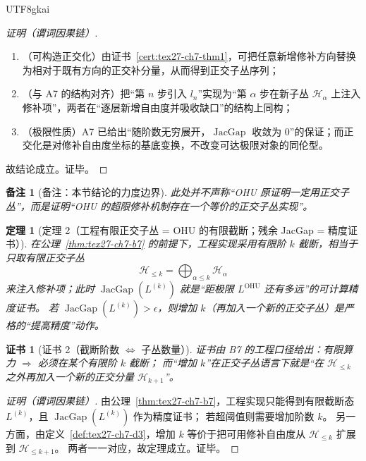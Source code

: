 \documentclass[12pt]{article}
\newtheorem{theorem}{定理}[section]
\newtheorem{remark}{备注}[section]
\newtheorem{Certificate}{证书}[section]
\newcommand{\JacGap}{\operatorname{JacGap}}
\begin{document}
\begin{CJK*}{UTF8}{gkai}
\begin{proof}[证明（谓词因果链）]
\begin{enumerate}
  \item（可构造正交化）由证书~\ref{cert:tex27-ch7-thm1}，可把任意新增修补方向替换为相对于既有方向的正交补分量，从而得到正交子丛序列；
  \item（与 A7 的结构对齐）把“第 $n$ 步引入 $l_n$”实现为“第 $\alpha$ 步在新子丛 $\mathcal{H}_\alpha$ 上注入修补项”，两者在“逐层新增自由度并吸收缺口”的结构上同构；
  \item（极限性质）A7 已给出“随阶数无穷展开，$\JacGap$ 收敛为 0”的保证；而正交化是对修补自由度坐标的基底变换，不改变可达极限对象的同伦型。
\end{enumerate}
故结论成立。证毕。
\end{proof}

\begin{remark}[备注：本节结论的力度边界]
此处并不声称“OHU 原证明一定用正交子丛”，而是证明“OHU 的超限修补机制\emph{存在一个等价的正交子丛实现}”。
\end{remark}

\begin{theorem}[定理 2（工程有限正交子丛 = OHU 的有限截断；残余 JacGap = 精度证书）]
\label{thm:tex27-ch7-thm2}
在公理~\ref{thm:tex27-ch7-b7} 的前提下，工程实现采用有限阶 $k$ 截断，相当于只取有限正交子丛
\[
  \mathcal{H}_{\le k}=\bigoplus_{\alpha\le k}\mathcal{H}_\alpha
\]
来注入修补项；此时 $\JacGap(L^{(k)})$ 就是“距极限 $L^{\mathrm{OHU}}$ 还有多远”的可计算精度证书。
若 $\JacGap(L^{(k)})>\epsilon$，则增加 $k$（再加入一个新的正交子丛）是严格的“提高精度”动作。
\end{theorem}

\begin{Certificate}[证书 2（截断阶数 $\Leftrightarrow$ 子丛数量）]
\label{cert:tex27-ch7-thm2}
证书由 B7 的工程口径给出：有限算力 $\Rightarrow$ 必须在某个有限阶 $k$ 截断；
而“增加 $k$”在正交子丛语言下就是“在 $\mathcal{H}_{\le k}$ 之外再加入一个新的正交分量 $\mathcal{H}_{k+1}$”。
\end{Certificate}

\begin{proof}[证明（谓词因果链）]
由公理~\ref{thm:tex27-ch7-b7}，工程实现只能得到有限截断态 $L^{(k)}$，且 $\JacGap(L^{(k)})$ 作为精度证书；
若超阈值则需要增加阶数 $k$。
另一方面，由定义~\ref{def:tex27-ch7-d3}，增加 $k$ 等价于把可用修补自由度从 $\mathcal{H}_{\le k}$ 扩展到 $\mathcal{H}_{\le k+1}$。
两者一一对应，故定理成立。证毕。
\end{proof}


\end{CJK*}
\end{document}
